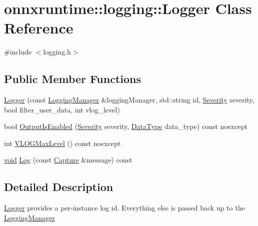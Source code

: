 \hypertarget{classonnxruntime_1_1logging_1_1Logger}{}\section{onnxruntime\+:\+:logging\+:\+:Logger Class Reference}
\label{classonnxruntime_1_1logging_1_1Logger}


{\ttfamily \#include $<$logging.\+h$>$}

\subsection*{Public Member Functions}
\begin{DoxyCompactItemize}
\item 
\mbox{\hyperlink{classonnxruntime_1_1logging_1_1Logger_a93669a2737346f2ee71b1b91eebdf453}{Logger}} (const \mbox{\hyperlink{classonnxruntime_1_1logging_1_1LoggingManager}{Logging\+Manager}} \&logging\+Manager, std\+::string id, \mbox{\hyperlink{namespaceonnxruntime_1_1logging_a7daeb33e1b0e6a6df8c23d142af78e81}{Severity}} severity, bool filter\+\_\+user\+\_\+data, int vlog\+\_\+level)
\item 
bool \mbox{\hyperlink{classonnxruntime_1_1logging_1_1Logger_ac42898a3e3c2623280b244180f28490d}{Output\+Is\+Enabled}} (\mbox{\hyperlink{namespaceonnxruntime_1_1logging_a7daeb33e1b0e6a6df8c23d142af78e81}{Severity}} severity, \mbox{\hyperlink{namespaceonnxruntime_1_1logging_a7342198e47b8ad2717a5d6e28cf68951}{Data\+Type}} data\+\_\+type) const noexcept
\item 
int \mbox{\hyperlink{classonnxruntime_1_1logging_1_1Logger_af2e3439096494a094a9780eb2e238c95}{V\+L\+O\+G\+Max\+Level}} () const noexcept
\item 
\mbox{\hyperlink{mlasi_8h_a88f941d423cb2a819b70a1358982b1a6}{void}} \mbox{\hyperlink{classonnxruntime_1_1logging_1_1Logger_a72e6467ee8cede10dbc9d2aea649f8fe}{Log}} (const \mbox{\hyperlink{classonnxruntime_1_1logging_1_1Capture}{Capture}} \&message) const
\end{DoxyCompactItemize}


\subsection{Detailed Description}
\mbox{\hyperlink{classonnxruntime_1_1logging_1_1Logger}{Logger}} provides a per-\/instance log id. Everything else is passed back up to the \mbox{\hyperlink{classonnxruntime_1_1logging_1_1LoggingManager}{Logging\+Manager}} 

